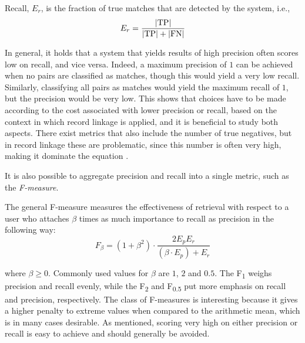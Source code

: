 \begin{definition}[Recall]
    Recall, $E_{r}$, is the fraction of true matches that are detected by the system, i.e.,
    \begin{equation*}
        E_{r} = \frac{ \lvert\text{TP}\rvert }{ \lvert\text{TP}\rvert + \lvert\text{FN}\rvert }
    \end{equation*}
\end{definition}

In general, it holds that a system that yields results of high precision often scores low on recall, and vice versa.
Indeed, a maximum precision of $1$ can be achieved when no pairs are classified as matches, though this would yield a very low recall.
Similarly, classifying all pairs as matches would yield the maximum recall of $1$, but the precision would be very low.
This shows that choices have to be made according to the cost associated with lower precision or recall, based on the context in which record linkage is applied, and it is beneficial to study both aspects.
There exist metrics that also include the number of true negatives, but in record linkage these are problematic, since this number is often very high, making it dominate the equation \citep{Christen2012}.

It is also possible to aggregate precision and recall into a single metric, such as the \emph{F-measure}.

\begin{definition}[F-measure]
    The general F-measure measures the effectiveness of retrieval with respect to a user who attaches $\beta$ times as much importance to recall as precision \citep{Rijsbergen1979} in the following way:
    \begin{equation*}
        F_{\beta} = (1 + \beta^{2}) \cdot \frac{2 E_{p} E_{r}}{(\beta \cdot E_{p}) + E_{r}}
    \end{equation*}
    \label{def:fmeasure}
\end{definition}

\noindent where $\beta \geq 0$.
Commonly used values for $\beta$ are $1$, $2$ and $0.5$. The F\textsubscript{1} weighs precision and recall evenly, while the F\textsubscript{2} and F\textsubscript{0.5} put more emphasis on recall and precision, respectively.
The class of F-measures is interesting because it gives a higher penalty to extreme values when compared to the arithmetic mean, which is in many cases desirable.
As mentioned, scoring very high on either precision or recall is easy to achieve and should generally be avoided.

